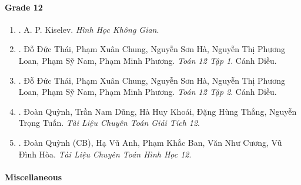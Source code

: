 \documentclass{article}
\begin{document}
\paragraph{Grade 12}

\begin{enumerate}
	\item \cite{Kiselev_hhkg}. A. P. Kiselev. {\it Hình Học Không Gian}.\hfill{\sf[reading]}

    \item \cite{SGK_Toan_12_CD_tap_1}. {\sc Đỗ Đức Thái, Phạm Xuân Chung, Nguyễn Sơn Hà, Nguyễn Thị Phương Loan, Phạm Sỹ Nam, Phạm Minh Phương}. {\it Toán 12 Tập 1}. Cánh Diều.

    \item \cite{SGK_Toan_12_CD_tap_2}. {\sc Đỗ Đức Thái, Phạm Xuân Chung, Nguyễn Sơn Hà, Nguyễn Thị Phương Loan, Phạm Sỹ Nam, Phạm Minh Phương}. {\it Toán 12 Tập 2}. Cánh Diều.

	\item \cite{TLCT_giai_tich_12}. {\sc Đoàn Quỳnh, Trần Nam Dũng, Hà Huy Khoái, Đặng Hùng Thắng, Nguyễn Trọng Tuấn}. {\it Tài Liệu Chuyên Toán Giải Tích 12}.\hfill{\sf[reading]}

	\item \cite{TLCT_hinh_hoc_12}. Đoàn Quỳnh (CB), Hạ Vũ Anh, Phạm Khắc Ban, Văn Như Cương, Vũ Đình Hòa. {\it Tài Liệu Chuyên Toán Hình Học 12}.\hfill{\sf[reading]}
\end{enumerate}

\paragraph{Miscellaneous}
\end{document}
